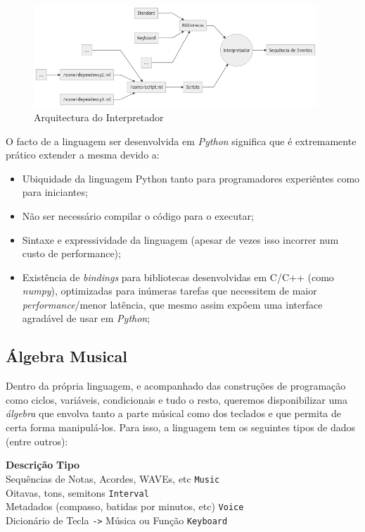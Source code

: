 \begin{figure}[h]
\begin{center}
    \includegraphics[width=0.95\textwidth]{img/diagram_virtualmachine.png}
\end{center}
\caption{Arquitectura do Interpretador}
\end{figure}
O facto de a linguagem ser desenvolvida em \textit{Python} significa que é extremamente prático extender a mesma devido a:
\begin{itemize}
    \item Ubiquidade da linguagem Python tanto para programadores experiêntes como para iniciantes;
    \item Não ser necessário compilar o código para o executar;
    \item Sintaxe e expressividade da linguagem (apesar de vezes isso incorrer num custo de performance);
    \item Existência de \textit{bindings} para bibliotecas desenvolvidas em C/C++ (como \textit{numpy}), optimizadas para inúmeras tarefas que necessitem de maior \textit{performance}/menor latência, que mesmo assim expôem uma interface agradável de usar em \textit{Python};
\end{itemize}

\subsection{Álgebra Musical}
Dentro da própria linguagem, e acompanhado das construções de programação como ciclos, variáveis, condicionais e tudo o resto, queremos disponibilizar uma \textit{álgebra} que envolva tanto a parte músical como dos teclados e que permita de certa forma manipulá-los. Para isso, a linguagem tem os seguintes tipos de dados (entre outros):

\medskip

\noindent
\textbf{Descrição}  \hfill  \textbf{Tipo} \ \  \\
Sequências de Notas, Acordes, WAVEs, etc \dotfill  \texttt{Music}  \\
Oitavas, tons, semitons \dotfill  \texttt{Interval} \\
Metadados (compasso, batidas por minutos, etc) \dotfill  \texttt{Voice} \\
Dicionário de Tecla \texttt{->} Música ou Função \dotfill  \texttt{Keyboard} \\

